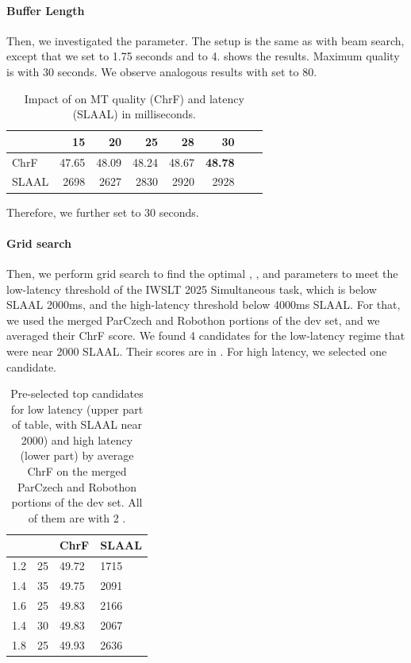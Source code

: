 \documentclass[11pt]{article}
\begin{document}
\paragraph{Buffer Length} Then, we investigated the \BufferLen{} parameter. The setup is the same as with beam search, except that we set \MinChunkSize{} to 1.75 seconds and \Frames{} to 4.  shows the results. Maximum quality is with \BufferLen{} 30 seconds. We observe analogous results with \Frames{} set to 80.


\begin{table}[]
    \centering
    \begin{tabular}{l|r@{~}r@{~}r@{~}r@{~}r@{~}r@{~}r@{~}}
\BufferLen{}& 15 & 20 & 25 & 28 & 30 \\
\hline
ChrF & 47.65 & 48.09 & 48.24 & 48.67 & \textbf{48.78} &   \\
SLAAL & 2698 & 2627 & 2830 & 2920 &  2928 \\
    \end{tabular}
    \caption{Impact of \BufferLen{} on MT quality (ChrF) and latency (SLAAL) in milliseconds.}
    \label{tab:buffer}
\end{table}


Therefore, we further set %
\BufferLen{} to 30 seconds.

\paragraph{Grid search} Then, we perform grid search to find the optimal \MinChunkSize{}, \Frames{}, and \Beams{} parameters to meet the low-latency threshold of the IWSLT 2025 Simultaneous task, which is below SLAAL 2000ms, and the high-latency threshold below 4000ms SLAAL. For that, we used the merged ParCzech and Robothon portions of the dev set, and we averaged their ChrF score. We found 4 candidates for the low-latency regime that were near 2000 SLAAL. Their scores are in . For high latency, we selected one candidate.

\begin{table}[]
    \centering
    \begin{tabular}{ll|ll}
\MinChunkSize{} & \Frames{} & ChrF & SLAAL \\
\hline
  1.2 & 25 & 49.72 & 1715 \\
  1.4 & 35 & 49.75 & 2091 \\
  1.6 & 25  & 49.83 & 2166 \\
  1.4 & 30  & 49.83 & 2067 \\
  \hline
  1.8 & 25 & 49.93 & 2636 \\
    \end{tabular}
    \caption{Pre-selected top candidates for low latency (upper part of table, with SLAAL near 2000) and high latency (lower part) by average ChrF on the merged ParCzech and Robothon portions of the dev set. All of them are with 2 \Beams{}.}
    \label{tab:grid}
\end{table}
\end{document}
